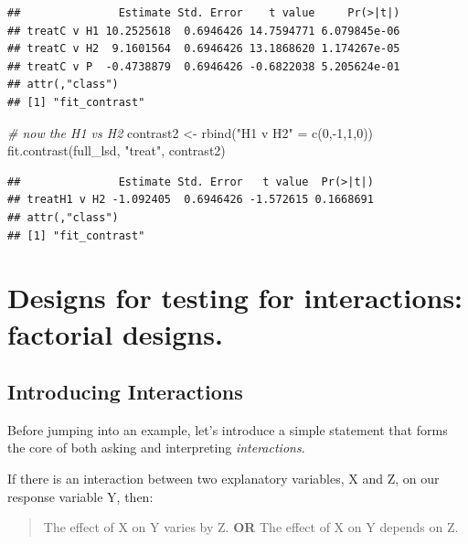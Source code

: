 \documentclass[
]{book}
\newenvironment{Shaded}{\begin{snugshade}}{\end{snugshade}}
\newcommand{\CommentTok}[1]{\textcolor[rgb]{0.56,0.35,0.01}{\textit{#1}}}
\newcommand{\DecValTok}[1]{\textcolor[rgb]{0.00,0.00,0.81}{#1}}
\newcommand{\FunctionTok}[1]{\textcolor[rgb]{0.00,0.00,0.00}{#1}}
\newcommand{\NormalTok}[1]{#1}
\newcommand{\OtherTok}[1]{\textcolor[rgb]{0.56,0.35,0.01}{#1}}
\newcommand{\SpecialCharTok}[1]{\textcolor[rgb]{0.00,0.00,0.00}{#1}}
\newcommand{\StringTok}[1]{\textcolor[rgb]{0.31,0.60,0.02}{#1}}
\begin{document}
\begin{verbatim}
##               Estimate Std. Error    t value     Pr(>|t|)
## treatC v H1 10.2525618  0.6946426 14.7594771 6.079845e-06
## treatC v H2  9.1601564  0.6946426 13.1868620 1.174267e-05
## treatC v P  -0.4738879  0.6946426 -0.6822038 5.205624e-01
## attr(,"class")
## [1] "fit_contrast"
\end{verbatim}

\begin{Shaded}
\begin{Highlighting}[]
\CommentTok{\# now the H1 vs H2}
\NormalTok{contrast2 }\OtherTok{\textless{}{-}} \FunctionTok{rbind}\NormalTok{(}\StringTok{"H1 v H2"} \OtherTok{=} \FunctionTok{c}\NormalTok{(}\DecValTok{0}\NormalTok{,}\SpecialCharTok{{-}}\DecValTok{1}\NormalTok{,}\DecValTok{1}\NormalTok{,}\DecValTok{0}\NormalTok{))}
\FunctionTok{fit.contrast}\NormalTok{(full\_lsd, }\StringTok{"treat"}\NormalTok{, contrast2)}
\end{Highlighting}
\end{Shaded}

\begin{verbatim}
##               Estimate Std. Error   t value  Pr(>|t|)
## treatH1 v H2 -1.092405  0.6946426 -1.572615 0.1668691
## attr(,"class")
## [1] "fit_contrast"
\end{verbatim}

\hypertarget{designs-for-testing-for-interactions-factorial-designs.}{%
\chapter{Designs for testing for interactions: factorial designs.}\label{designs-for-testing-for-interactions-factorial-designs.}}

\hypertarget{introducing-interactions}{%
\section{Introducing Interactions}\label{introducing-interactions}}

Before jumping into an example, let's introduce a simple statement that forms the core of both asking and interpreting \emph{interactions}.

If there is an interaction between two explanatory variables, X and Z, on our response variable Y, then:

\begin{quote}
The effect of X on Y varies by Z. \textbf{OR} The effect of X on Y depends on Z.
\end{quote}
\end{document}
